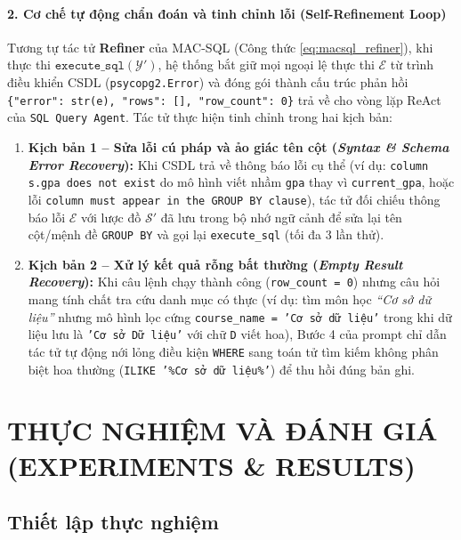 \documentclass[12pt,a4paper]{report}
\begin{document}
\subsubsection{2. Cơ chế tự động chẩn đoán và tinh chỉnh lỗi (Self-Refinement Loop)}
Tương tự tác tử \textbf{Refiner} của MAC-SQL (Công thức \ref{eq:macsql_refiner}), khi thực thi $\texttt{execute\_sql}(\mathcal{Y}')$, hệ thống bắt giữ mọi ngoại lệ thực thi $\mathcal{E}$ từ trình điều khiển CSDL (\texttt{psycopg2.Error}) và đóng gói thành cấu trúc phản hồi \texttt{\{"error": str(e), "rows": [], "row\_count": 0\}} trả về cho vòng lặp ReAct của \texttt{SQL Query Agent}. Tác tử thực hiện tinh chỉnh trong hai kịch bản:
\begin{enumerate}
    \item \textbf{Kịch bản 1 -- Sửa lỗi cú pháp và ảo giác tên cột (\textit{Syntax \& Schema Error Recovery}):} Khi CSDL trả về thông báo lỗi cụ thể (ví dụ: \texttt{column s.gpa does not exist} do mô hình viết nhầm \texttt{gpa} thay vì \texttt{current\_gpa}, hoặc lỗi \texttt{column must appear in the GROUP BY clause}), tác tử đối chiếu thông báo lỗi $\mathcal{E}$ với lược đồ $\mathcal{S}'$ đã lưu trong bộ nhớ ngữ cảnh để sửa lại tên cột/mệnh đề \texttt{GROUP BY} và gọi lại \texttt{execute\_sql} (tối đa 3 lần thử).
    \item \textbf{Kịch bản 2 -- Xử lý kết quả rỗng bất thường (\textit{Empty Result Recovery}):} Khi câu lệnh chạy thành công (\texttt{row\_count = 0}) nhưng câu hỏi mang tính chất tra cứu danh mục có thực (ví dụ: tìm môn học \textit{``Cơ sở dữ liệu''} nhưng mô hình lọc cứng \texttt{course\_name = 'Cơ sở dữ liệu'} trong khi dữ liệu lưu là \texttt{'Cơ sở Dữ liệu'} với chữ \texttt{D} viết hoa), Bước 4 của prompt chỉ dẫn tác tử tự động nới lỏng điều kiện \texttt{WHERE} sang toán tử tìm kiếm không phân biệt hoa thường (\texttt{ILIKE '\%Cơ sở dữ liệu\%'}) để thu hồi đúng bản ghi.
\end{enumerate}

\chapter{THỰC NGHIỆM VÀ ĐÁNH GIÁ (EXPERIMENTS \& RESULTS)}

\section{Thiết lập thực nghiệm}
\end{document}
